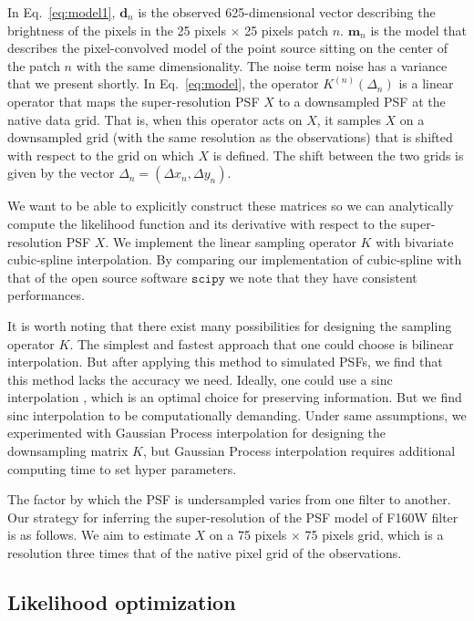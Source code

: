 In Eq.~\ref{eq:model1}, $\mathbf{d}_{n}$ is the observed 625-dimensional vector describing the brightness of the pixels in the 25 pixels $\times$ 25 pixels patch $n$. 
$\mathbf{m}_{n}$ is the model that describes the pixel-convolved model of the point source sitting on the center of the patch $n$ with the same dimensionality. The 
noise term $\mathrm{noise}$ has a variance that we present shortly.
In Eq.~\ref{eq:model}, the operator $K^{(n)}(\Delta_n)$ is a linear operator that maps the super-resolution PSF $X$ to a downsampled PSF at the native 
data grid. That is, when this operator acts on $X$, it samples $X$ on a downsampled grid (with the same resolution as the observations) 
that is shifted with respect to the grid on which $X$ is defined. The shift between the two grids is given by the vector $\Delta_n = (\Delta x_n , \Delta y_n)$.


We want to be able to explicitly construct these matrices so we can analytically compute the likelihood function and its derivative with respect to the super-resolution PSF $X$. 
We implement the linear sampling operator $K$ with bivariate cubic-spline interpolation. By comparing our implementation of cubic-spline with that of the open source 
software $\mathtt{scipy}$ we note that they have consistent performances.

It is worth noting that there exist many possibilities for designing the sampling operator $K$.  The simplest and fastest approach that one could 
choose is bilinear interpolation. But after applying this method to simulated PSFs, we find that this method lacks the accuracy we 
need. Ideally, one could use a sinc interpolation \citep{bickerton,galsim}, which is an optimal choice for preserving information.
But we find sinc interpolation to be computationally demanding. Under same assumptions, we experimented with Gaussian Process interpolation for designing the downsampling matrix $K$, but Gaussian Process interpolation requires additional computing time to set hyper parameters.


The factor by which the PSF is undersampled varies from one filter to another. Our strategy for inferring the super-resolution of the PSF model of F160W filter is as follows. 
We aim to estimate $X$ on a 75 pixels $\times$ 75 pixels grid, which is a resolution three times that of the native pixel grid of the observations.

\subsection{Likelihood optimization}

